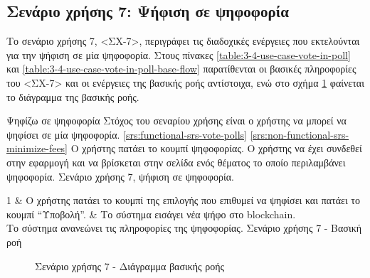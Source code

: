 \subsection{Σενάριο χρήσης 7: Ψήφιση σε ψηφοφορία} \label{subsection:3-4-use-case-vote-in-poll}

Το σενάριο χρήσης 7, <ΣΧ-7>, περιγράφει τις διαδοχικές ενέργειες που εκτελούνται για την ψήφιση σε μία ψηφοφορία. Στους πίνακες \ref{table:3-4-use-case-vote-in-poll} και \ref{table:3-4-use-case-vote-in-poll-base-flow} παρατίθενται οι βασικές πληροφορίες του <ΣΧ-7> και οι ενέργειες της βασικής ροής αντίστοιχα, ενώ στο σχήμα \ref{figure:3-4-use-case-vote-in-poll-base-flow-sequence-diagram} φαίνεται το διάγραμμα της βασικής ροής.

\useCaseTable
{Ψηφίζω σε ψηφοφορία}
{Στόχος του σεναρίου χρήσης είναι ο χρήστης να μπορεί να ψηφίσει σε μία ψηφοφορία.}
{\ref{srs:functional-srs-vote-polls}}
{\ref{srs:non-functional-srs-minimize-fees}}
{Ο χρήστης πατάει το κουμπί ψηφοφορίας.}
{Ο χρήστης να έχει συνδεθεί στην εφαρμογή και να βρίσκεται στην σελίδα ενός θέματος το οποίο περιλαμβάνει ψηφοφορία.}
{Σενάριο χρήσης 7, ψήφιση σε ψηφοφορία.}
{\label{table:3-4-use-case-vote-in-poll}}


\useCaseBaseFlowTable
{
    1 & Ο χρήστης πατάει το κουμπί της επιλογής που επιθυμεί να ψηφίσει και πατάει το κουμπί ``Υποβολή''. & Το σύστημα εισάγει νέα ψήφο στο blockchain. \\ [0.5ex]
}
{Το σύστημα ανανεώνει τις πληροφορίες της ψηφοφορίας.}
{Σενάριο χρήσης 7 - Βασική ροή}
{\label{table:3-4-use-case-vote-in-poll-base-flow}}

\begin{figure}[H]
    \centering
    
    \caption{Σενάριο χρήσης 7 - Διάγραμμα βασικής ροής}
    \label{figure:3-4-use-case-vote-in-poll-base-flow-sequence-diagram}
\end{figure}
